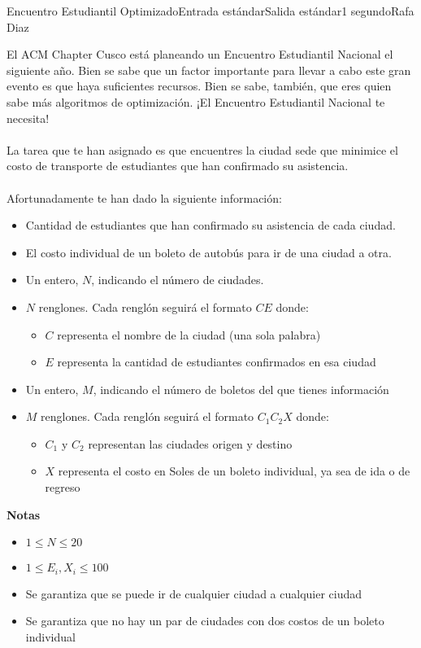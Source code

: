 \begin{problem}{Encuentro Estudiantil Optimizado}{Entrada estándar}{Salida estándar}{1 segundo}{}{Rafa Diaz}

El ACM Chapter Cusco está planeando un Encuentro Estudiantil Nacional el siguiente año. Bien se sabe que un factor importante para llevar a cabo este gran evento es que haya suficientes recursos. Bien se sabe, también, que eres quien sabe más algoritmos de optimización. ¡El Encuentro Estudiantil Nacional te necesita!
\\\\
La tarea que te han asignado es que encuentres la ciudad sede que minimice el costo de transporte de estudiantes que han confirmado su asistencia.
\\\\
Afortunadamente te han dado la siguiente información:
\begin{itemize}
    \item Cantidad de estudiantes que han confirmado su asistencia de cada ciudad.
    \item El costo individual de un boleto de autobús para ir de una ciudad a otra.
\end{itemize}


\InputFile
\begin{itemize}
    \item Un entero, $N$, indicando el número de ciudades.

\item $N$ renglones. Cada renglón seguirá el formato $C E$ donde:
\begin{itemize}
  \item  $C$ representa el nombre de la ciudad (una sola palabra)
  \item  $E$ representa la cantidad de estudiantes confirmados en esa ciudad
  \end{itemize}
\item Un entero, $M$, indicando el número de boletos del que tienes información
\item $M$ renglones. Cada renglón seguirá el formato $C_1 C_2 X$ donde:
\begin{itemize}
    

  \item  $C_1$ y $C_2$ representan las ciudades origen y destino
  \item  $X$ representa el costo en Soles de un boleto individual, ya sea de ida o de regreso
\end{itemize}
\end{itemize}
\textbf{Notas}
\begin{itemize}
\item  $1 \le N \le 20$
\item  $1 \le E_i, X_i \le 100$
\item  Se garantiza que se puede ir de cualquier ciudad a cualquier ciudad
\item  Se garantiza que no hay un par de ciudades con dos costos de un boleto individual
\end{itemize}
\OutputFile


\end{problem}
